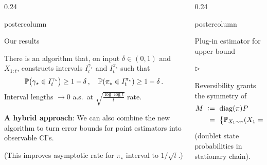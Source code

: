 \documentclass[notheorems,final]{beamer}
\newcommand{\compresslist}{%
  \setlength{\itemsep}{1pt}%
  \setlength{\parskip}{0pt}%
  \setlength{\parsep}{0pt}%
  \setlength{\leftmargin}{0.7cm}%
}
\newlength{\columnheight}
\newcommand\pimin{\ensuremath{\pi_{\star}}}
\newcommand\gap{\ensuremath{\gamma_{\star}}}
\newcommand\states{\ensuremath{\mathcal{X}}}
\begin{document}
\begin{frame}{}
\begin{columns}
\begin{column}{0.24\textwidth}
\begin{beamercolorbox}[center,wd=\textwidth]{postercolumn}
\begin{minipage}[T]{.95\textwidth}
{\begin{block}{Our results}
                \begin{theorem}
                  There is an algorithm that, on input $\delta \in
                  (0,1)$ and $X_{1:t}$, constructs intervals
                  $I_t^{\gap}$ and $I_t^{\pimin}$ such that
                  \[
                    \P\Parens{
                      \gap \in I_t^{\gap}
                    }
                    \geq 1-\delta
                    \,,
                    \quad
                    \P\Parens{
                      \pimin \in I_t^{\pimin}
                    }
                    \geq 1-\delta
                    \,.
                  \]
                  Interval lengths $\to0$ a.s.~at
                  $\sqrt{\frac{\log\log t}{t}}$ rate.
                \end{theorem}

                \vspace{1.5cm}
                \textbf{A hybrid approach}:
                We can also combine the new algorithm to turn error
                bounds for point estimators into observable CI's.

                {\small(This improves asymptotic rate for $\pimin$
                interval to $1/\sqrt{t}$.)}

              \end{block}
            }
          \end{minipage}
        \end{beamercolorbox}
      \end{column}
      \begin{column}{0.24\textwidth}
        \begin{beamercolorbox}[center,wd=\textwidth]{postercolumn}
          \begin{minipage}[T]{.95\textwidth}
            \parbox[t][\columnheight]{\textwidth}{
              \begin{block}{Plug-in estimator for upper bound}
                \begin{list}{$\triangleright$}\compresslist
                  \item
                    Reversibility grants the symmetry of
                    \begin{align*}
                      M
                      & \ := \
                      \diag(\pi) P
                      \\
                      & \ \hphantom:= \
                      \Braces{ \P_{X_1 \sim \pi}(X_1=x,X_2=x') }_{x,x'\in\states}
                    \end{align*}
                    {\small(doublet state probabilities in stationary chain)}.


\end{list}
\end{block}}
\end{minipage}
\end{beamercolorbox}
\end{column}
\end{columns}
\end{frame}
\end{document}
